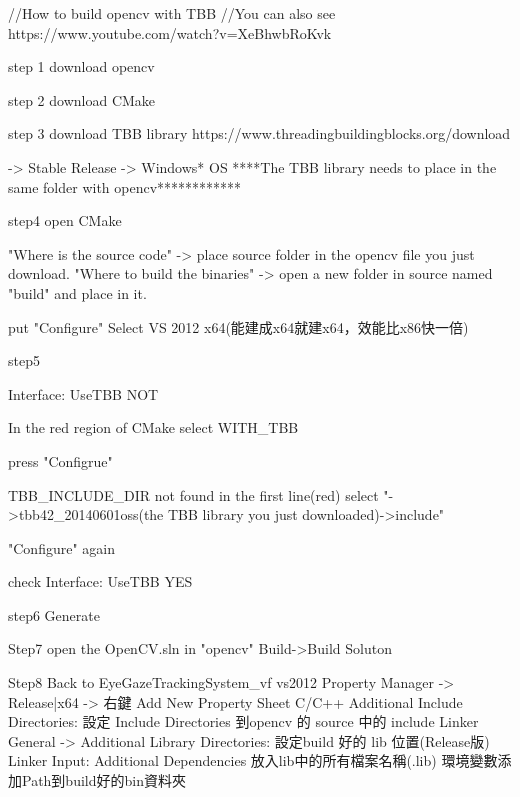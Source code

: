 //How to build opencv with TBB
//You can also see https://www.youtube.com/watch?v=XeBhwbRoKvk


step 1 
download opencv

step 2
download CMake

step 3
download TBB library
https://www.threadingbuildingblocks.org/download

-> Stable Release -> Windows* OS
****The TBB library needs to place in the same folder with opencv************

step4
open CMake

"Where is the source code" -> place source folder in the opencv file you just download.
"Where to build the binaries" -> open a new folder in source named "build" and place in it.

put "Configure"
Select VS 2012 x64(能建成x64就建x64，效能比x86快一倍)

step5

Interface:
UseTBB   NOT

In the red region of CMake
select WITH_TBB

press "Configrue"

TBB_INCLUDE_DIR not found in the first line(red)
select "->tbb42_20140601oss(the TBB library you just downloaded)->include"

"Configure" again

check Interface:
UseTBB   YES


step6
Generate


Step7 
open the OpenCV.sln in "opencv\src\build" 
Build->Build Soluton

Step8
Back to EyeGazeTrackingSystem_vf vs2012 
Property Manager -> Release|x64 -> 右鍵 Add New Property Sheet
C/C++ Additional Include Directories: 設定 Include Directories 到opencv 的 source 中的 include
Linker General -> Additional Library Directories: 設定build 好的 lib 位置(Release版)
Linker Input: Additional Dependencies 放入lib中的所有檔案名稱(.lib)
環境變數添加Path到build好的bin資料夾







